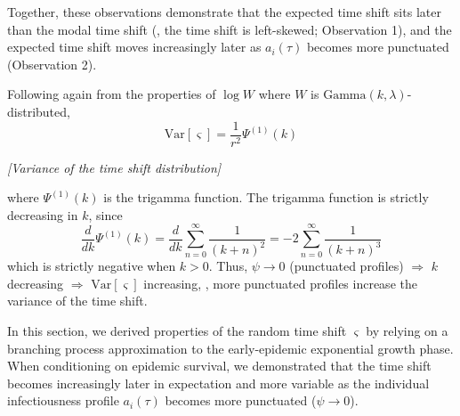 \noindent Together, these observations demonstrate that the expected time shift sits later than the modal time shift (\ie, the time shift is left-skewed; Observation 1), and the expected time shift moves increasingly later as $a_i(\tau)$ becomes more punctuated (Observation 2). 

 Following again from the properties of $\log W$ where $W$ is $\text{Gamma}(k, \lambda)$-distributed, 
\begin{equation}
	\boxed{\text{Var}[\varsigma] = \frac{1}{r^2} \Psi^{(1)}(k)}
\end{equation}
\begin{center}
	{\it [Variance of the time shift distribution]}
\end{center}
where $\Psi^{(1)}(k)$ is the trigamma function. The trigamma function is strictly decreasing in $k$, since 
\begin{equation}
\frac{d}{dk} \Psi^{(1)}(k) =  \frac{d}{dk }\sum_{n=0}^\infty \frac{1}{(k+n)^2} = 
-2 \sum_{n=0}^\infty \frac{1}{(k + n)^3}
\end{equation}
which is strictly negative when $k > 0$. Thus, $\psi \rightarrow 0$ (punctuated profiles) $\Rightarrow$ $k$ decreasing $\Rightarrow$ $\text{Var}[\varsigma]$ increasing, \ie, more punctuated profiles increase the variance of the time shift. 

 In this section, we derived properties of the random time shift $\varsigma$ by relying on a branching process approximation to the early-epidemic exponential growth phase. When conditioning on epidemic survival, we demonstrated that the time shift becomes increasingly later in expectation and more variable as the individual infectiousness profile $a_i(\tau)$ becomes more punctuated ($\psi \rightarrow 0$).

\clearpage



